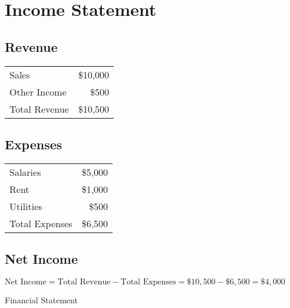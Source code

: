 \begin{figure}[h]
  \centering
  \caption{Financial Statement}
  \label{fig:financial_statement}
  
  \section*{Income Statement}
  
  \subsection*{Revenue}
  \begin{tabular}{lr}
    Sales & \$10,000 \\
    Other Income & \$500 \\
    \midrule
    Total Revenue & \$10,500 \\
  \end{tabular}
  
  \subsection*{Expenses}
  \begin{tabular}{lr}
    Salaries & \$5,000 \\
    Rent & \$1,000 \\
    Utilities & \$500 \\
    \midrule
    Total Expenses & \$6,500 \\
  \end{tabular}
  
  \subsection*{Net Income}
  \[
  \text{Net Income} = \text{Total Revenue} - \text{Total Expenses} = \$10,500 - \$6,500 = \$4,000
  \]
\end{figure}

